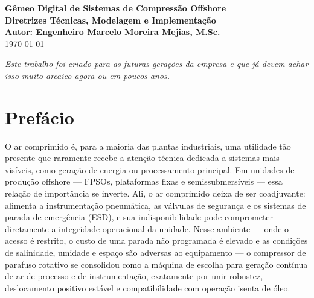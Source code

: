 \documentclass[12pt,a4paper]{article}
\numberwithin{equation}{section}
\numberwithin{table}{section}
\numberwithin{figure}{section}
\begin{document}
	
	\begin{titlepage}
		\centering
		\vspace*{2cm}
		{\Huge \textbf{Gêmeo Digital de Sistemas de Compressão Offshore}} \\[0.5cm]
		{\Large \textbf{Diretrizes Técnicas, Modelagem e Implementação}} \\[4cm]
		
		\vfill
		{\large \textbf{Autor: Engenheiro Marcelo Moreira Mejias, M.Sc.}} \\[0.5cm]
	
		{\large \today}
	\end{titlepage}
	
	\newpage
	\vspace*{\fill}
	\begin{flushright}
		\textit{Este trabalho foi criado para as futuras gerações da empresa e que já devem achar isso muito arcaico agora ou em poucos anos.}
	\end{flushright}
	\vspace*{\fill}
	

\newpage
\section*{Prefácio}

O ar comprimido é, para a maioria das plantas industriais, uma utilidade tão presente que raramente recebe a atenção técnica dedicada a sistemas mais visíveis, como geração de energia ou processamento principal. Em unidades de produção offshore — FPSOs, plataformas fixas e semissubmersíveis — essa relação de importância se inverte. Ali, o ar comprimido deixa de ser coadjuvante: alimenta a instrumentação pneumática, as válvulas de segurança e os sistemas de parada de emergência (ESD), e sua indisponibilidade pode comprometer diretamente a integridade operacional da unidade. Nesse ambiente — onde o acesso é restrito, o custo de uma parada não programada é elevado e as condições de salinidade, umidade e espaço são adversas ao equipamento — o compressor de parafuso rotativo se consolidou como a máquina de escolha para geração contínua de ar de processo e de instrumentação, exatamente por unir robustez, deslocamento positivo estável e compatibilidade com operação isenta de óleo.
\end{document}
